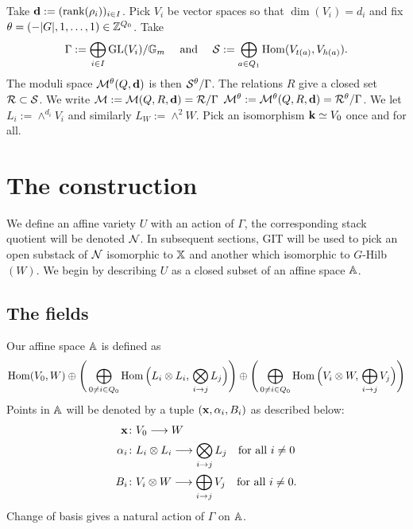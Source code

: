 \documentclass{amsart}
\theoremstyle{definition}
\begin{document}
Take $\mathbf{d}:=(\text{rank}(\rho_i))_{i \in I}$. Pick $V_i$ be vector spaces so that $\dim(V_i)=d_i$ and fix $\theta = (-|G|,1, \ldots, 1) \in \mathbb{Z}^{Q_0}$.
Take $$\Gamma:= \bigoplus_{i \in I} \text{GL}(V_i) / \mathbb{G}_m \quad \text{ and }\quad\mathcal{S}:=\bigoplus_{a \in Q_1} \operatorname{Hom}(V_{t(a)}, V_{h(a)}).$$
The moduli space $\mathcal{M}^\theta(Q,\mathbf{d})$ is then $\mathcal{S}^\theta / \Gamma$.
The relations $R$ give a closed set $\mathcal{R} \subset \mathcal{S}$.
We write $\mathcal{M}:= \mathcal{M}(Q,R,\mathbf{d})=\mathcal{R}/\Gamma$ $\mathcal{M}^\theta:=\mathcal{M}^\theta(Q,R,\mathbf{d})=\mathcal{R}^\theta/\Gamma$.
We let $L_i:= \wedge^{d_i} V_i$ and similarly $L_W:= \wedge^2 W$.
Pick an isomorphism $\mathbf{k} \simeq V_0$ once and for all.


\section{The construction}

We define an affine variety $U$ with an action of $\Gamma$, the corresponding stack quotient will be denoted $\mathcal{N}$.
In subsequent sections, GIT will be used to pick an open substack of $\mathcal{N}$ isomorphic to $\mathbb{X}$ and another which isomorphic to $G$-Hilb$(W)$.
We begin by describing $U$ as a closed subset of an affine space $\mathbb{A}$.

\subsection{The fields}
Our affine space $\mathbb{A}$ is defined as
\begin{equation*}
    \operatorname{Hom}(V_0,W) \oplus \Bigg(\bigoplus_{0\neq i \in Q_0} \operatorname{Hom}\Big(L_i \otimes L_i,\, \bigotimes_{i \rightarrow j} L_j\Big) \Bigg) \oplus  \Bigg(\bigoplus_{0\neq i \in Q_0} \operatorname{Hom}\Big(V_i \otimes W,\, \bigoplus_{i \rightarrow j} V_j\Big) \Bigg)
\end{equation*}
Points in $\mathbb{A}$ will be denoted by a tuple $(\mathbf{x},\alpha_i, B_i)$ as described below:
\begin{align}
\mathbf{x} \colon &V_0 \longrightarrow W \label{fd:x} \\
\alpha_i \colon &L_i \otimes L_i \longrightarrow \bigotimes_{i \rightarrow j} L_j \quad \text{for all} \,\, i\neq 0 \label{fd:alpha} \\
 B_i \colon &V_i \otimes W \longrightarrow \bigoplus_{i \rightarrow j} V_j \quad \text{for all} \,\, i\neq 0. \label{fd:B}
\end{align}
Change of basis gives a natural action of $\Gamma$ on $\mathbb{A}$.
\end{document}
